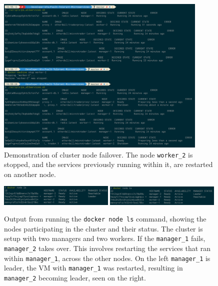 \begin{figure}[H]
\centering
\includegraphics[width=0.9\textwidth]{../media/servicefailover.png} 
\caption{Demonstration of cluster node failover. The node 
	\texttt{worker\_2} is stopped, and the services previously running within it,
		are restarted on another node.}
\label{fig:servicefailover}
\end{figure}

\begin{figure}[H]
\centering
\includegraphics[width=0.49\textwidth]{../media/manager1leader.png} 
\includegraphics[width=0.49\textwidth]{../media/manager2leader.png} 
\caption{Output from running the \texttt{docker node ls} command, showing the nodes
		participating in the cluster and their status. The cluster is setup with
		two managers and two workers. If the \texttt{manager\_1} fails, \texttt{manager\_2} takes
		over. This involves restarting the services that ran within \texttt{manager\_1},
		across the other nodes. On the left \texttt{manager\_1} is leader, the
		VM with \texttt{manager\_1} was restarted, resulting in \texttt{manager\_2}
		becoming leader, seen on the right. }
\label{fig:manager1leader}
\end{figure}
